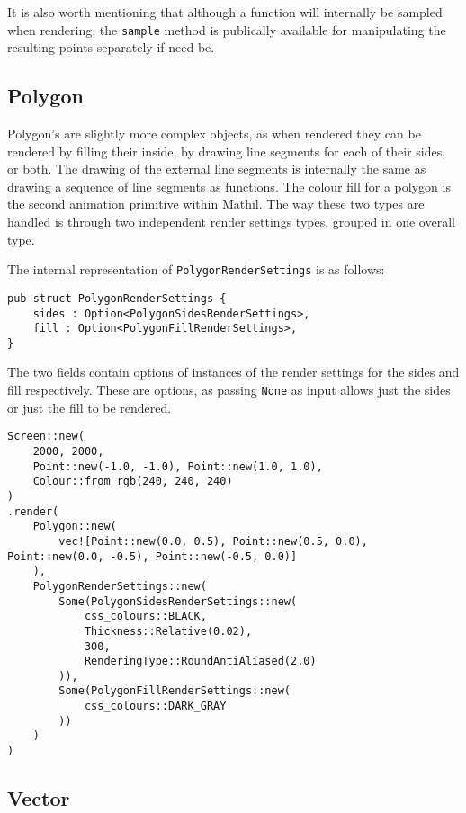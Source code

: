 
It is also worth mentioning that although a function will internally be sampled when rendering, the \verb|sample| method is publically available for manipulating the resulting points separately if need be.

\subsection{Polygon}

Polygon's are slightly more complex objects, as when rendered they can be rendered by filling their inside, by drawing line segments for each of their sides, or both. The drawing of the external line segments is internally the same as drawing a sequence of line segments as functions. The colour fill for a polygon is the second animation primitive within Mathil. The way these two types are handled is through two independent render settings types, grouped in one overall type.

The internal representation of \verb|PolygonRenderSettings| is as follows:

\begin{lstlisting}
pub struct PolygonRenderSettings {
    sides : Option<PolygonSidesRenderSettings>,
    fill : Option<PolygonFillRenderSettings>,
}   
\end{lstlisting}

The two fields contain options of instances of the render settings for the sides and fill respectively. These are options, as passing \verb|None| as input allows just the sides or just the fill to be rendered.

\begin{lstlisting}
Screen::new(
    2000, 2000,
    Point::new(-1.0, -1.0), Point::new(1.0, 1.0),
    Colour::from_rgb(240, 240, 240)
)
.render(
    Polygon::new(
        vec![Point::new(0.0, 0.5), Point::new(0.5, 0.0), Point::new(0.0, -0.5), Point::new(-0.5, 0.0)]
    ),
    PolygonRenderSettings::new(
        Some(PolygonSidesRenderSettings::new(
            css_colours::BLACK,
            Thickness::Relative(0.02),
            300,
            RenderingType::RoundAntiAliased(2.0)
        )),
        Some(PolygonFillRenderSettings::new(
            css_colours::DARK_GRAY
        ))
    )
)
\end{lstlisting}


\subsection{Vector}

